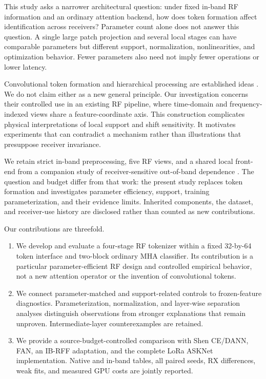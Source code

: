\documentclass[journal]{IEEEtran}
\begin{document}
This study asks a narrower architectural question: under fixed in-band RF information and an ordinary attention backend, how does token formation affect identification across receivers? Parameter count alone does not answer this question. A single large patch projection and several local stages can have comparable parameters but different support, normalization, nonlinearities, and optimization behavior. Fewer parameters also need not imply fewer operations or lower latency.

Convolutional token formation and hierarchical processing are established ideas \cite{wu2021cvt,wang2021pvt,liu2021swin}. We do not claim either as a new general principle. Our investigation concerns their controlled use in an existing RF pipeline, where time-domain and frequency-indexed views share a feature-coordinate axis. This construction complicates physical interpretations of local support and shift sensitivity. It motivates experiments that can contradict a mechanism rather than illustrations that presuppose receiver invariance.

We retain strict in-band preprocessing, five RF views, and a shared local front-end from a companion study of receiver-sensitive out-of-band dependence \cite{oobcompanion}. The question and budget differ from that work: the present study replaces token formation and investigates parameter efficiency, support, training parameterization, and their evidence limits. Inherited components, the dataset, and receiver-use history are disclosed rather than counted as new contributions.

Our contributions are threefold.
\begin{enumerate}
\item We develop and evaluate a four-stage RF tokenizer within a fixed 32-by-64 token interface and two-block ordinary MHA classifier. Its contribution is a particular parameter-efficient RF design and controlled empirical behavior, not a new attention operator or the invention of convolutional tokens.
\item We connect parameter-matched and support-related controls to frozen-feature diagnostics. Parameterization, normalization, and layer-wise separation analyses distinguish observations from stronger explanations that remain unproven. Intermediate-layer counterexamples are retained.
\item We provide a source-budget-controlled comparison with Shen CE/DANN, FAN, an IB-RFF adaptation, and the complete LoRa ASKNet implementation. Native and in-band tables, all paired seeds, RX differences, weak fits, and measured GPU costs are jointly reported.
\end{enumerate}
\end{document}
